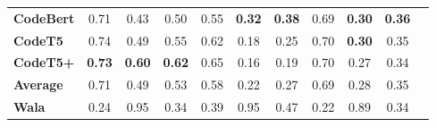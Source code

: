 \begin{tabular}{lcccccccccc}
\textbf{CodeBert} & 0.71 & 0.43 & 0.50 & 0.55 & \textbf{0.32} & \textbf{0.38} & 0.69 & \textbf{0.30} & \textbf{0.36} \\
\textbf{CodeT5} & 0.74 & 0.49 & 0.55 & 0.62 & 0.18 & 0.25 & 0.70 & \textbf{0.30} & 0.35 \\
\textbf{CodeT5+} & \textbf{0.73} & \textbf{0.60} & \textbf{0.62} & 0.65 & 0.16 & 0.19 & 0.70 & 0.27 & 0.34 \\
\midrule
\textbf{Average} & 0.71 & 0.49 & 0.53 & 0.58 & 0.22 & 0.27 & 0.69 & 0.28 & 0.35 \\
\midrule
\textbf{Wala} & 0.24 & 0.95 & 0.34 & 0.39 & 0.95 & 0.47 & 0.22 & 0.89 & 0.34 \\
\bottomrule
\end{tabular}
